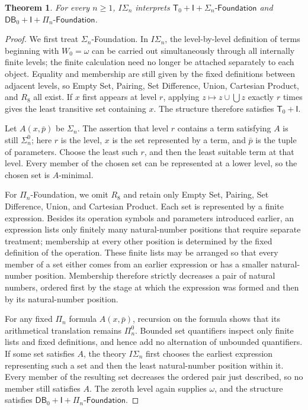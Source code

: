 \documentclass[11pt,a4paper]{article}
\newcommand{\IS}[1]{I\Sigma_{#1}}
\newcommand{\DB}{\mathsf{DB}_{0}}
\newcommand{\Tzero}{\mathsf T_{0}}
\newcommand{\Fnd}[1]{#1\text{-}\mathsf{Foundation}}
\newcommand{\Inf}{\mathsf I}
\theoremstyle{plain}
\newtheorem{theorem}{Theorem}[section]
\theoremstyle{definition}
\theoremstyle{remark}
\begin{document}
\begin{theorem}
  For every \(n\geq1\), \(\IS{n}\) interprets
  \(\Tzero+\Inf+\Fnd{\Sigma_n}\) and
  \(\DB+\Inf+\Fnd{\Pi_n}\).
\end{theorem}
\begin{proof}
  We first treat \(\Sigma_n\)-Foundation. In \(I\Sigma_n\), the level-by-level definition of terms beginning with \(W_0=\omega\) can be carried out simultaneously through all internally finite levels; the finite calculation need no longer be attached separately to each object. Equality and membership are still given by the fixed definitions between adjacent levels, so Empty Set, Pairing, Set Difference, Union, Cartesian Product, and \(R_8\) all exist. If \(x\) first appears at level \(r\), applying \(z\mapsto z\cup\bigcup z\) exactly \(r\) times gives the least transitive set containing \(x\). The structure therefore satisfies \(\Tzero+\Inf\).

  Let \(A(x,\bar p)\) be \(\Sigma_n\). The assertion that level \(r\) contains a term satisfying \(A\) is still \(\Sigma_n^0\); here \(r\) is the level, \(x\) is the set represented by a term, and \(\bar p\) is the tuple of parameters. Choose the least such \(r\), and then the least suitable term at that level. Every member of the chosen set can be represented at a lower level, so the chosen set is \(A\)-minimal.

  For \(\Pi_n\)-Foundation, we omit \(R_8\) and retain only Empty Set, Pairing, Set Difference, Union, and Cartesian Product. Each set is represented by a finite expression. Besides its operation symbols and parameters introduced earlier, an expression lists only finitely many natural-number positions that require separate treatment; membership at every other position is determined by the fixed definition of the operation. These finite lists may be arranged so that every member of a set either comes from an earlier expression or has a smaller natural-number position. Membership therefore strictly decreases a pair of natural numbers, ordered first by the stage at which the expression was formed and then by its natural-number position.

  For any fixed \(\Pi_n\) formula \(A(x,\bar p)\), recursion on the formula shows that its arithmetical translation remains \(\Pi_n^0\). Bounded set quantifiers inspect only finite lists and fixed definitions, and hence add no alternation of unbounded quantifiers. If some set satisfies \(A\), the theory \(I\Sigma_n\) first chooses the earliest expression representing such a set and then the least natural-number position within it. Every member of the resulting set decreases the ordered pair just described, so no member still satisfies \(A\). The zeroth level again supplies \(\omega\), and the structure satisfies \(\DB+\Inf+\Fnd{\Pi_n}\).
\end{proof}
\end{document}
